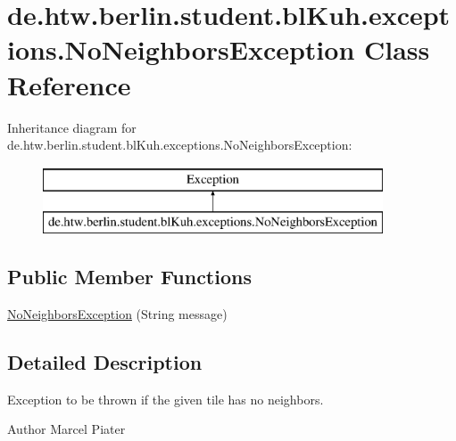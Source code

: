 \hypertarget{classde_1_1htw_1_1berlin_1_1student_1_1bl_kuh_1_1exceptions_1_1_no_neighbors_exception}{\section{de.\-htw.\-berlin.\-student.\-bl\-Kuh.\-exceptions.\-No\-Neighbors\-Exception Class Reference}
\label{classde_1_1htw_1_1berlin_1_1student_1_1bl_kuh_1_1exceptions_1_1_no_neighbors_exception}
}
Inheritance diagram for de.\-htw.\-berlin.\-student.\-bl\-Kuh.\-exceptions.\-No\-Neighbors\-Exception\-:\begin{figure}[H]
\begin{center}
\leavevmode
\includegraphics[height=2.000000cm]{classde_1_1htw_1_1berlin_1_1student_1_1bl_kuh_1_1exceptions_1_1_no_neighbors_exception}
\end{center}
\end{figure}
\subsection*{Public Member Functions}
\begin{DoxyCompactItemize}
\item 
\hyperlink{classde_1_1htw_1_1berlin_1_1student_1_1bl_kuh_1_1exceptions_1_1_no_neighbors_exception_ad6cd3043ac50230530d476426f8e462e}{No\-Neighbors\-Exception} (String message)
\end{DoxyCompactItemize}


\subsection{Detailed Description}
Exception to be thrown if the given tile has no neighbors.

\begin{DoxyAuthor}{Author}
Marcel Piater 
\end{DoxyAuthor}


